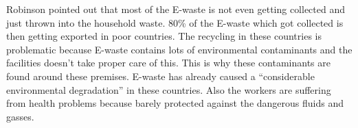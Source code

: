 Robinson \cite{Robinson2009} pointed out that most of the E-waste is not even getting collected and just thrown into the household waste. 80\% of the E-waste which got collected is then getting exported in poor countries. The recycling in these countries is problematic because E-waste contains lots of environmental contaminants and the facilities doesn't take proper care of this. This is why these contaminants are found around these premises. E-waste has already caused a "`considerable environmental degradation"'\cite{Robinson2009} in these countries. Also the workers are suffering from health problems because barely protected against the dangerous fluids and gasses.